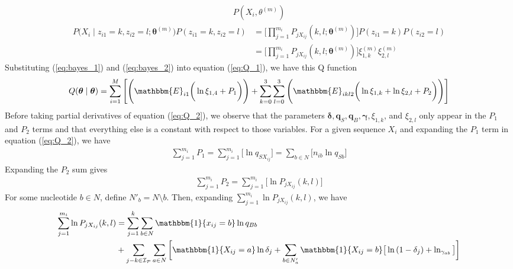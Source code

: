 \documentclass[10pt]{article}
\begin{document}
\begin{enumerate}[label = \textbf{\arabic*.}]
\begin{align}
                    {{P(X_i,\theta^{(m)}) \nonumber}}
            \end{align}
            \begin{align}
                P\big(X_i \mid z_{i1} = k, z_{i2} = l; \bm{\theta}^{(m)} \big)P(z_{i1} = k, z_{i2} = l)\nonumber
                    &=\bigg[\prod_{j = 1}^{m_i}P_{jX_{ij}}(k, l; \bm{\theta}^{(m)})\bigg]P(z_{i1} = k)P(z_{i2} = l)\nonumber\\
                    &=\bigg[\prod_{j = 1}^{m_i}P_{jX_{ij}}(k, l; \bm{\theta}^{(m)})\bigg]\xi_{1, k}^{(m)}\xi_{2, l}^{(m)}
            \end{align}
        Substituting (\ref{eq:bayes_1}) and (\ref{eq:bayes_2}) into equation (\ref{eq:Q_1}), we have this Q function
            \begin{align}\label{eq:Q_2}
                Q(\bm{\theta} \mid \bm{\theta}) &= \sum_{i = 1}^M\Bigg[\Bigg(\mathbbm{E}_{i1}\bigg(\ln{\xi_{1, 4}}+P_1\bigg)\Bigg) + \sum_{k = 0}^3\sum_{l = 0}^3\Bigg(\mathbbm{E}_{ikl2}\bigg(\ln{\xi_{1, k}}+\ln{\xi_{2, l}} + P_2\bigg) \Bigg) \Bigg]\nonumber\\
            \end{align}
        Before taking partial derivatives of equation (\ref{eq:Q_2}), we observe that the parameters $\bm{\delta}, \bm{q}_S, \bm{q}_B, \bm{\gamma}, \xi_{1, k}$, and $\xi_{2, l}$ only appear in the $P_1$ and $P_2$ terms and that everything else is a constant with respect to those variables.  For a given sequence $X_i$ and expanding the $P_1$ term in equation (\ref{eq:Q_2}), we have
            \begin{align}\label{eq:P_1}
                \sum_{j = 1}^{m_i}P_1 = \sum_{j = 1}^{m_i}\big[\ln{q_{SX_{ij}}}\big] = \sum_{b \in N}\big[ n_{ib} \ln{q_{Sb}}\big]
            \end{align}
        Expanding the $P_2$ sum gives
            \begin{align}\label{eq:P_2_1}
                \sum_{j = 1}^{m_i} P_2 = \sum_{j = 1}^{m_i}\big[\ln{P_{jX_{ij}}(k, l)}\big]
            \end{align}
        For some nucleotide $b \in N$, define $N'_{b} = N \setminus {b}$.  Then, expanding $\sum_{j = 1}^{m_i}\ln{P_{jX_{ij}}}(k, l)$, we have
            \begin{align}\label{eq:sum_ln_p}
                \sum_{j = 1}^{m_i}\ln{P_{jX_{ij}}}(k, l) &= \sum_{j = 1}^k\sum_{b \in N}\mathbbm{1}\{x_{ij} = b\} \ln{q_{Bb}} \nonumber\\
                &+\sum_{j - k \in \mathcal{I_P}}\sum_{a \in N}\bigg[\mathbbm{1}\{X_{ij} = a\}\ln{\delta_j} + \sum_{b \in N'_a}\mathbbm{1}\{X_{ij} = b\}\big[ \ln{(1 - \delta_j)} + \ln_{\gamma_{ab}} \big]\bigg]\nonumber\\

\end{align}
\end{enumerate}
\end{document}
